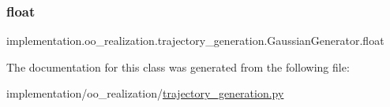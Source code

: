 \subsubsection{\texorpdfstring{float}{float}}
{\footnotesize\ttfamily implementation.\+oo\+\_\+realization.\+trajectory\+\_\+generation.\+Gaussian\+Generator.\+float\hspace{0.3cm}{\ttfamily [static]}}



The documentation for this class was generated from the following file\+:\begin{DoxyCompactItemize}
\item 
implementation/oo\+\_\+realization/\hyperlink{trajectory__generation_8py}{trajectory\+\_\+generation.\+py}\end{DoxyCompactItemize}
